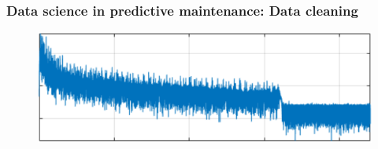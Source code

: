 \documentclass{beamer}
\begin{document}
\begin{frame}
	\frametitle{Data science in predictive maintenance: Data cleaning}
	\begin{figure}[H]
		\centering
		\includegraphics[width=1\linewidth]{vibration}
	\end{figure}
\end{frame}
\end{document}
